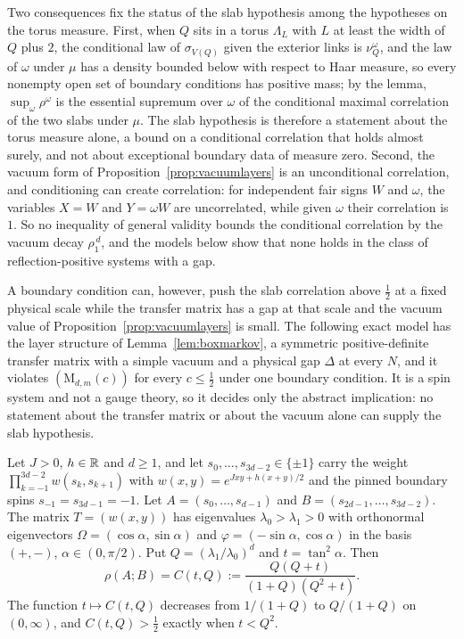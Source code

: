 Two consequences fix the status of the slab hypothesis among the
hypotheses on the torus measure. First, when $Q$ sits in a torus
$\Lambda_L$ with $L$ at least the width of $Q$ plus $2$, the conditional
law of $\sigma_{V(Q)}$ given the exterior links is $\nu^\omega_Q$, and the
law of $\omega$ under $\mu$ has a density bounded below with respect to Haar
measure, so every nonempty open set of boundary conditions has positive
mass; by the lemma, $\sup_\omega\rho^\omega$ is the essential supremum over
$\omega$ of the conditional maximal correlation of the two slabs under
$\mu$. The slab hypothesis is therefore a statement about the torus measure
alone, a bound on a conditional correlation that holds almost surely, and
not about exceptional boundary data of measure zero. Second, the vacuum
form of Proposition~\ref{prop:vacuumlayers} is an unconditional
correlation, and conditioning can create correlation: for independent fair
signs $W$ and $\omega$, the variables $X=W$ and $Y=\omega W$ are uncorrelated,
while given $\omega$ their correlation is $1$. So no inequality of general
validity bounds the conditional correlation by the vacuum decay
$\rho_1^{\,d}$, and the models below show that none holds in the class of
reflection-positive systems with a gap.

A boundary condition can, however, push the slab correlation above
$\frac12$ at a fixed physical scale while the transfer matrix has a gap at
that scale and the vacuum value of Proposition~\ref{prop:vacuumlayers} is
small. The following exact model has the layer structure of
Lemma~\ref{lem:boxmarkov}, a symmetric positive-definite transfer matrix
with a simple vacuum and a physical gap $\Delta$ at every $N$, and it
violates $(\mathrm M_{d,m}(c))$ for every $c\le\frac12$ under one boundary
condition. It is a spin system and not a gauge theory, so it decides only
the abstract implication: no statement about the transfer matrix or about
the vacuum alone can supply the slab hypothesis.

\begin{lemma}\label{lem:pinnedchain}
Let $J>0$, $h\in\mathbb{R}$ and $d\ge1$, and let $s_0,\dots,s_{3d-2}\in\{\pm1\}$
carry the weight $\prod_{k=-1}^{3d-2}w(s_k,s_{k+1})$ with $w(x,y)=e^{Jxy+h
(x+y)/2}$ and the pinned boundary spins $s_{-1}=s_{3d-1}=-1$. Let $A=(s_0,
\dots,s_{d-1})$ and $B=(s_{2d-1},\dots,s_{3d-2})$. The matrix $T=(w(x,y))$
has eigenvalues $\lambda_0>\lambda_1>0$ with orthonormal eigenvectors
$\Omega=(\cos\alpha,\sin\alpha)$ and $\varphi=(-\sin\alpha,\cos\alpha)$ in
the basis $(+,-)$, $\alpha\in(0,\pi/2)$. Put $Q=(\lambda_1/\lambda_0)^d$ and
$t=\tan^2\alpha$. Then
\[
\rho(A;B)=C(t,Q):=\frac{Q(Q+t)}{(1+Q)(Q^2+t)} .
\]
The function $t\mapsto C(t,Q)$ decreases from $1/(1+Q)$ to $Q/(1+Q)$ on
$(0,\infty)$, and $C(t,Q)>\frac12$ exactly when $t<Q^2$.
\end{lemma}


